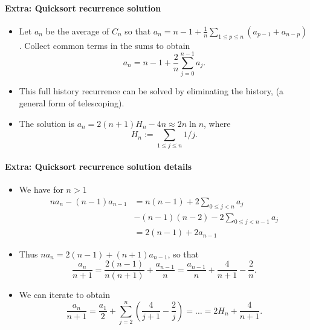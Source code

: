 \paragraph{Extra: Quicksort recurrence solution}
\begin{itemize}
\item Let $a_n$ be the average of $C_n$ so that 
$a_n = n - 1 + \frac{1}{n} \sum_{1\leq p \leq n} (a_{p-1} + a_{n-p})$. 
Collect common terms in the sums to obtain
$$a_n = n - 1 + \frac{2}{n} \sum_{j=0}^{n-1} a_j.$$ 
\item This {full history} recurrence can be solved by 
{eliminating the history}, (a general form of {telescoping}). 
\item The solution is 
$a_n = 2 (n + 1) H_n - 4n \approx 2 n \ln n$, where 
$$H_n:= \sum_{1\leq j \leq n} 1/j.$$ 
\end{itemize}

    
\paragraph{Extra: Quicksort recurrence solution details}
\begin{itemize}
\item  We have for $n>1$
\begin{align*}
na_n - (n-1) a_{n-1} & = n(n-1) + 2 \sum_{0\leq j < n} a_j \\
& - (n-1)(n-2) - 2\sum_{0 \leq j < n - 1} a_j \\
& = 2(n - 1) + 2 a_{n-1}
\end{align*}
\item
Thus $na_n = 2(n - 1) + (n+1)a_{n-1}$, so that 
$$
\frac{a_n}{n+1} = \frac{2(n-1)}{n(n+1)} + \frac{a_{n-1}}{n} = 
\frac{a_{n-1}}{n} + \frac{4}{n+1} - \frac{2}{n}.
$$
\item
We can iterate to obtain
$$\frac{a_n}{n+1} = \frac{a_1}{2} + \sum_{j=2}^n \left(\frac{4}{j+1} - 
\frac{2}{j}\right) = \dots = 2H_n + \frac{4}{n+1}.$$
\end{itemize}

